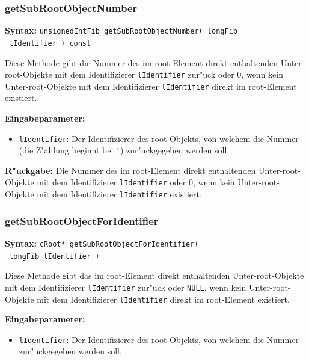 \subsubsection{getSubRootObjectNumber}

\textbf{Syntax:} \verb|unsignedIntFib getSubRootObjectNumber( longFib| \\\verb| lIdentifier ) const|

\bigskip\noindent
Diese Methode gibt die Nummer des im root-Element direkt enthaltenden Unter-root-Objekte mit dem Identifizierer \verb|lIdentifier| zur"uck oder $0$, wenn kein Unter-root-Objekte mit dem Identifizierer \verb|lIdentifier| direkt im root-Element existiert.

\bigskip\noindent
\textbf{Eingabeparameter:}
\begin{itemize}
 \item \verb|lIdentifier|: Der Identifizierer des root-Objekts, von welchem die Nummer (die Z"ahlung beginnt bei $1$) zur"uckgegeben werden soll.
\end{itemize}

\bigskip\noindent
\textbf{R"uckgabe:} Die Nummer des im root-Element direkt enthaltenden Unter-root-Objekte mit dem Identifizierer \verb|lIdentifier| oder $0$, wenn kein Unter-root-Objekte mit dem Identifizierer \verb|lIdentifier| existiert.


\subsubsection{getSubRootObjectForIdentifier}

\textbf{Syntax:} \verb|cRoot* getSubRootObjectForIdentifier(| \\\verb| longFib lIdentifier )|

\bigskip\noindent
Diese Methode gibt das im root-Element direkt enthaltenden Unter-root-Objekte mit dem Identifizierer \verb|lIdentifier| zur"uck oder \verb|NULL|, wenn kein Unter-root-Objekte mit dem Identifizierer \verb|lIdentifier| direkt im root-Element existiert.

\bigskip\noindent
\textbf{Eingabeparameter:}
\begin{itemize}
 \item \verb|lIdentifier|: Der Identifizierer des root-Objekts, von welchem die Nummer zur"uckgegeben werden soll.
\end{itemize}

